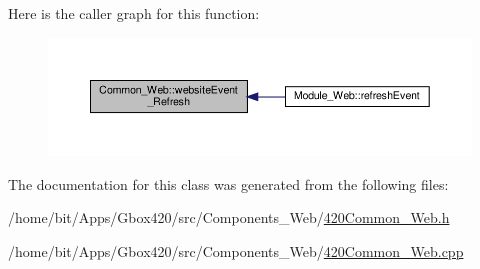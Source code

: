 Here is the caller graph for this function\+:
\nopagebreak
\begin{figure}[H]
\begin{center}
\leavevmode
\includegraphics[width=350pt]{class_common___web_aaca7c54fdcf908e4e1256b7b1f6fc212_icgraph}
\end{center}
\end{figure}


The documentation for this class was generated from the following files\+:\begin{DoxyCompactItemize}
\item 
/home/bit/\+Apps/\+Gbox420/src/\+Components\+\_\+\+Web/\hyperlink{420_common___web_8h}{420\+Common\+\_\+\+Web.\+h}\item 
/home/bit/\+Apps/\+Gbox420/src/\+Components\+\_\+\+Web/\hyperlink{420_common___web_8cpp}{420\+Common\+\_\+\+Web.\+cpp}\end{DoxyCompactItemize}
